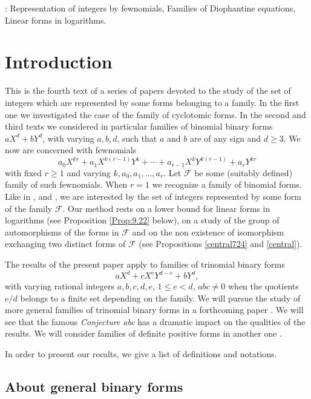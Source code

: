 \documentclass[10pt]{article}
\theoremstyle{definition}
\numberwithin{equation}{section}
\begin{document}
\medskip
 : Representation of integers by fewnomials, Families of Diophantine equations,
Linear forms in logarithms.


 \section{Introduction} %
 This is the fourth text of a series of papers devoted to the study of the set of integers which are represented by some forms belonging to a family. In the first one \cite{FW0} we investigated the case of the family of cyclotomic forms. In the second and third texts \cite{FW1, FW2} we considered in particular families of binomial binary forms $aX^d+bY^d$, with varying $a,b,d$, such that $a$ and $b$ are of any sign and $d \geqslant 3$. We now are concerned with fewnomials
\[
a_0X^{kr}+a_1X^{k(r-1)}Y^k+\cdots +a_{r-1}X^kY^{k(r-1)}+a_rY^{kr}
\]
with fixed $r\geqslant 1$ and varying $k,a_0,a_1,\dots,a_r$. Let $\mathcal F$ be some (suitably defined) family of such fewnomials. When $r=1$ we recognize a family of binomial forms. 
Like in \cite{FW0}, \cite{FW1} and \cite{FW2}, we are interested by the set of integers represented by some form of the family $\mathcal F$. Our method rests on a lower bound for linear forms in logarithms (see Proposition \ref{Prop:9.22} below), on a study of the group of automorphisms of the forms in $\mathcal F$ 
and on the non existence of isomorphism exchanging two distinct forms of $\mathcal F$
(see Propositions \ref{central724} and \ref{central}).

The results of the present paper apply to families of trinomial binary forms 
\[
aX^d+cX^eY^{d-e} +bY^d,
\] 
with varying rational integers $a,b,c,d,e$, $1\leqslant e<d$, $abc\not=0$ when the quotients $e/d$ belongs to a finite set depending on the family. We will pursue the study of more general families of trinomial binary forms in a forthcoming paper \cite{FW6+}. We will see that the famous {\it Conjecture abc } has a dramatic impact on the qualities of the results. We will consider families of definite positive forms in another one \cite {FW6}. 

In order to present our results, we give a list of definitions and notations.

\subsection{About general binary forms}
\end{document}
